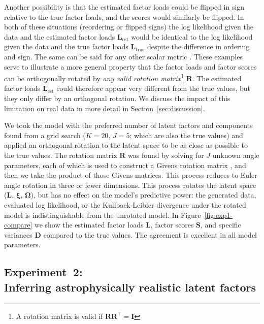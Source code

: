 \documentclass[twocolumn]{aastex62}
\newcommand{\vect}[1]{\boldsymbol{\mathbf{#1}}}
\renewcommand{\vec}[1]{\vect{#1}}
\newcommand{\transpose}{^\intercal}
\newcommand{\factorloads}{\textbf{L}}
\newcommand{\factorscores}{\textbf{S}}
\newcommand{\specificvariance}{\vec{D}}
\newcommand{\scoremeans}{\vec\xi}
\newcommand{\scorecovs}{\vec\Omega}
\newcommand{\NumLatentFactors}{J}
\newcommand{\NumComponents}{K}
\begin{document}
Another possibility is that the estimated factor loads could be flipped in sign 
relative to the true factor loads, and the scores would similarly be flipped. 
In both of these situations (reordering or flipped signs) the log likelihood 
given the data and the estimated factor loads $\factorloads_\textrm{est}$ 
would be identical to the log likelihood given the data and the true factor loads 
$\factorloads_\textrm{true}$
despite the difference in ordering and sign. The same can be said for any other
scalar metric \citep[e.g., Kullback-Leibler divergence;][]{Kullback:1951}.
These examples serve to illustrate a more 
general property that the factor loads and factor scores can be orthogonally 
rotated by \emph{any valid rotation matrix}\footnote{A rotation matrix is valid if 
$\vec{R}\vec{R}\transpose = \vec{I}$} $\vec{R}$. The estimated factor loads 
$\factorloads_\textrm{est}$ could therefore appear very different from the true 
values, but they only differ by an orthogonal rotation. We discuss the impact of this limitation on real data in more detail in Section~\ref{sec:discussion}. 




We took the model with the preferred number of latent factors and components found
from a grid search ($\NumComponents = 20$, $\NumLatentFactors = 5$; which are also
the true values) and applied an orthogonal rotation to the latent space to be as
close as possible to the true values. The rotation matrix $\mathbf{R}$ was found
by solving for $\NumLatentFactors$ unknown angle parameters, each of which is used
to construct a Givens rotation matrix \citep{Givens:1958}, and then we take the product of those Givens
matrices. This process reduces to Euler angle rotation in three or fewer dimensions.
This process rotates the latent space
($\factorloads$, $\scoremeans$, $\scorecovs$), but has no effect on the model's 
predictive power: the generated data, evaluated log likelihood, or the Kullback-Leibler divergence \citep{Kullback:1951} under the
rotated model is indistinguishable from the unrotated model.
In Figure~\ref{fig:exp1-compare} we show the estimated factor loads $\factorloads$,
factor scores $\factorscores$, and specific variances $\specificvariance$ compared
to the true values. The agreement is excellent in all model parameters. 

 


\subsection{Experiment~2:\\Inferring astrophysically realistic latent factors}
\end{document}
